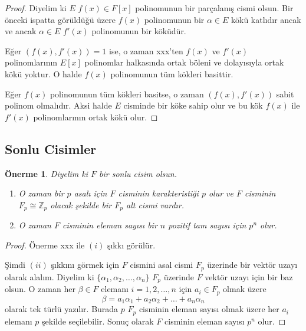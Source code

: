 \documentclass[draft]{article}
\newtheorem{prop}[thm]{Önerme}
\theoremstyle{definition}
\theoremstyle{remark}
\begin{document}
    	    \begin{proof}
    	        Diyelim ki $E$ $f(x) \in F[x]$ polinomunun bir parçalanış cismi olsun. Bir önceki ispatta görüldüğü üzere $f(x)$ polinomunun bir $\alpha \in E$ kökü katlıdır ancak ve ancak $\alpha \in E$ $f'(x)$ polinomunun bir köküdür.\par
    	        Eğer $(f(x), f'(x)) = 1$ ise, o zaman xxx'ten $f(x)$ ve $f'(x)$ polinomlarının $E[x]$ polinomlar halkasında ortak böleni ve dolayısıyla ortak kökü yoktur. O halde $f(x)$ polinomunun tüm kökleri basittir.\par
    	        Eğer $f(x)$ polinomunun tüm kökleri basitse, o zaman $(f(x), f'(x))$ sabit polinom olmalıdır. Aksi halde $E$ cisminde bir köke sahip olur ve bu kök $f(x)$ ile $f'(x)$ polinomlarının ortak kökü olur.
    	    \end{proof}
	        
    	\subsection{Sonlu Cisimler}
    	
    	    \begin{prop}
    	        Diyelim ki $F$ bir sonlu cisim olsun.
    	        \begin{enumerate}
				\renewcommand{\labelenumi}{(\roman{enumi})}
				    \item O zaman bir $p$ asalı için $F$ cisminin karakteristiği $p$ olur ve $F$ cisminin $F_p \cong \mathbb{Z}_p$ olacak şekilde bir $F_p$ alt cismi vardır.
				    \item O zaman $F$ cisminin eleman sayısı bir $n$ pozitif tam sayısı için $p^n$ olur.
				\end{enumerate}
    	    \end{prop}
    	    
    	    \begin{proof}
    	        Önerme xxx ile $(i)$ şıkkı görülür.\par
    	        Şimdi $(ii)$ şıkkını görmek için $F$ cismini asal cismi $F_p$ üzerinde bir vektör uzayı olarak alalım. Diyelim ki $\{\alpha_1, \alpha_2, \dots, \alpha_n\}$ $F_p$ üzerinde $F$ vektör uzayı için bir baz olsun. O zaman her $\beta \in F$ elemanı $i = 1, 2, \dots, n$ için $a_i \in F_p$ olmak üzere
    	        \begin{equation*}
    	            \beta = a_1\alpha_1 + a_2\alpha_2 + \dots + a_n\alpha_n
    	        \end{equation*}
    	        olarak tek türlü yazılır. Burada $p$ $F_p$ cisminin eleman sayısı olmak üzere her $a_i$ elemanı $p$ şekilde seçilebilir. Sonuç olarak $F$ cisminin eleman sayısı $p^n$ olur.
    	    \end{proof}
    	    
\end{document}
